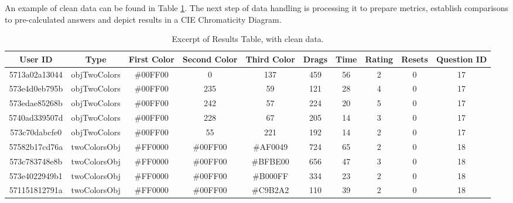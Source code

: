 %
An example of clean data can be found in Table \ref{table:csv_resultsclean}. The next step of data handling is processing it to prepare metrics, establish comparisons
to pre-calculated answers and depict results in a CIE Chromaticity Diagram. \par
%
\begin{table}[htbp]
  \resizebox{\textwidth}{!} {
  \begin{tabular} {|c|c|c|c|c|c|c|c|c|c|}
    \hline
    User ID & Type & First Color & Second Color & Third Color & Drags & Time & Rating & Resets & Question ID \\ \hline \hline
    5713a02a13044 & objTwoColors & \#00FF00 & 0 & 137 & 459 & 56 & 2 & 0 & 17 \\ \hline
    573e4d0eb795b & objTwoColors & \#00FF00 & 235 & 59 & 121 & 28 & 4 & 0 & 17 \\ \hline
    573edae85268b & objTwoColors & \#00FF00 & 242 & 57 & 224 & 20 & 5 & 0 & 17 \\ \hline
    5740ad339507d & objTwoColors & \#00FF00 & 228 & 67 & 205 & 14 & 3 & 0 & 17 \\ \hline
    573c70dabcfe0 & objTwoColors & \#00FF00 & 55 & 221 & 192 & 14 & 2 & 0 & 17 \\ \hline
    57582b17cd76a & twoColorsObj & \#FF0000 & \#00FF00 & \#AF0049 & 724 & 65 & 2 & 0 & 18 \\ \hline
    573c783748e8b & twoColorsObj & \#FF0000 & \#00FF00 & \#BFBE00 & 656 & 47 & 3 & 0 & 18 \\ \hline
    573e4022949b1 & twoColorsObj & \#FF0000 & \#00FF00 & \#B000FF & 334 & 23 & 2 & 0 & 18 \\ \hline
    571151812791a & twoColorsObj & \#FF0000 & \#00FF00 & \#C9B2A2 & 110 & 39 & 2 & 0 & 18 \\
    \hline
  \end{tabular}}
  \caption[Excerpt of Clean "Results" Table]{Excerpt of Results Table, with clean data.}
  \label{table:csv_resultsclean}
\end{table}
